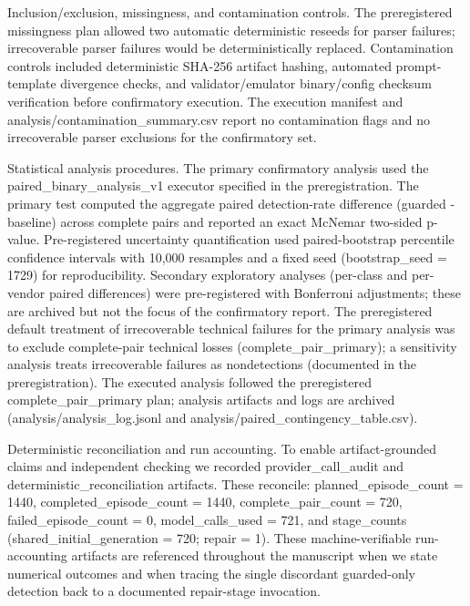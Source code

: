 \documentclass[conference]{IEEEtran}
\begin{document}
Inclusion/exclusion, missingness, and contamination controls. The preregistered missingness plan allowed two automatic deterministic reseeds for parser failures; irrecoverable parser failures would be deterministically replaced. Contamination controls included deterministic SHA-256 artifact hashing, automated prompt-template divergence checks, and validator/emulator binary/config checksum verification before confirmatory execution. The execution manifest and analysis/contamination\_summary.csv report no contamination flags and no irrecoverable parser exclusions for the confirmatory set.

Statistical analysis procedures. The primary confirmatory analysis used the paired\_binary\_analysis\_v1 executor specified in the preregistration. The primary test computed the aggregate paired detection-rate difference (guarded - baseline) across complete pairs and reported an exact McNemar two-sided p-value. Pre-registered uncertainty quantification used paired-bootstrap percentile confidence intervals with 10,000 resamples and a fixed seed (bootstrap\_seed = 1729) for reproducibility. Secondary exploratory analyses (per-class and per-vendor paired differences) were pre-registered with Bonferroni adjustments; these are archived but not the focus of the confirmatory report. The preregistered default treatment of irrecoverable technical failures for the primary analysis was to exclude complete-pair technical losses (complete\_pair\_primary); a sensitivity analysis treats irrecoverable failures as nondetections (documented in the preregistration). The executed analysis followed the preregistered complete\_pair\_primary plan; analysis artifacts and logs are archived (analysis/analysis\_log.jsonl and analysis/paired\_contingency\_table.csv).

Deterministic reconciliation and run accounting. To enable artifact-grounded claims and independent checking we recorded provider\_call\_audit and deterministic\_reconciliation artifacts. These reconcile: planned\_episode\_count = 1440, completed\_episode\_count = 1440, complete\_pair\_count = 720, failed\_episode\_count = 0, model\_calls\_used = 721, and stage\_counts (shared\_initial\_generation = 720; repair = 1). These machine-verifiable run-accounting artifacts are referenced throughout the manuscript when we state numerical outcomes and when tracing the single discordant guarded-only detection back to a documented repair-stage invocation.
\end{document}
